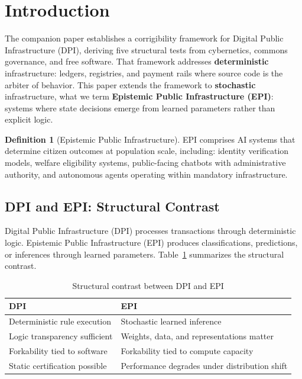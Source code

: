 \documentclass{article}
\theoremstyle{definition}
\newtheorem{definition}{Definition}[section]
\begin{document}
\section{Introduction}
\label{sec:intro}

The companion paper \citep{aravind2026dpi} establishes a corrigibility framework for Digital Public Infrastructure (DPI), deriving five structural tests from cybernetics, commons governance, and free software. That framework addresses \textbf{deterministic} infrastructure: ledgers, registries, and payment rails where source code is the arbiter of behavior. This paper extends the framework to \textbf{stochastic} infrastructure, what we term \textbf{Epistemic Public Infrastructure (EPI)}: systems where state decisions emerge from learned parameters rather than explicit logic.

\begin{definition}[Epistemic Public Infrastructure]
\label{def:epi}
EPI comprises AI systems that determine citizen outcomes at population scale, including: identity verification models, welfare eligibility systems, public-facing chatbots with administrative authority, and autonomous agents operating within mandatory infrastructure.
\end{definition}

\subsection{DPI and EPI: Structural Contrast}
\label{subsec:dpi-epi-contrast}

Digital Public Infrastructure (DPI) processes transactions through deterministic logic. Epistemic Public Infrastructure (EPI) produces classifications, predictions, or inferences through learned parameters. Table~\ref{tab:dpi-epi-contrast} summarizes the structural contrast.

\begin{table}[htbp]
\centering
\caption{Structural contrast between DPI and EPI}
\label{tab:dpi-epi-contrast}
\begin{tabular}{@{}ll@{}}
\toprule
\textbf{DPI} & \textbf{EPI} \\
\midrule
Deterministic rule execution & Stochastic learned inference \\
Logic transparency sufficient & Weights, data, and representations matter \\
Forkability tied to software & Forkability tied to compute capacity \\
Static certification possible & Performance degrades under distribution shift \\
\bottomrule
\end{tabular}
\end{table}
\end{document}
